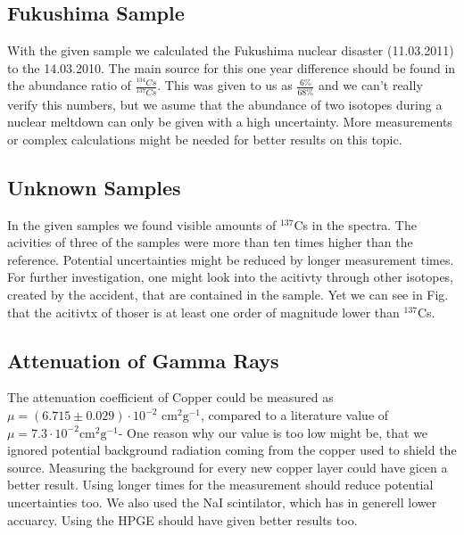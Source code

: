 \subsection{Fukushima Sample}
With the given sample we calculated the Fukushima nuclear disaster (11.03.2011) to the 14.03.2010.
The main source for this one year difference should be found in the abundance ratio of $\frac{^{134}Cs}{^{137}Cs}$.
This was given to us as $\frac{6 \%}{68\%}$ and we can't really verify this numbers, but we asume that the abundance of two isotopes during a nuclear meltdown can only be given with a high uncertainty.
More measurements or complex calculations might be needed for better results on this topic.

\subsection{Unknown Samples}

In the given samples we found visible amounts of $^{137}$Cs in the spectra.
The acivities of three of the samples were more than ten times higher than the reference. 
Potential uncertainties might be reduced by longer measurement times.
For further investigation, one might look into the acitivty through other isotopes, created by the accident, that are contained in the sample.
Yet we can see in Fig. that the acitivtx of thoser is at least one order of magnitude lower than  $^{137}$Cs.

\subsection{Attenuation of Gamma Rays}

The attenuation coefficient of Copper could be measured as $\mu = (6.715 \pm 0.029) \cdot 10^{-2}$ $\text{cm}^2 \text{g}^{-1}$, compared to a literature value of  $\mu = 7.3 \cdot 10^{-2}\text{cm}^2 \text{g}^{-1}$-
One reason why our value is too low might be, that we ignored potential background radiation coming from the copper used to shield the source.
Measuring the background for every new copper layer could have gicen a better result.
Using longer times for the measurement should reduce potential uncertainties too.
We also used the NaI scintilator, which has in generell lower accuarcy.
Using the HPGE should have given better results too.

